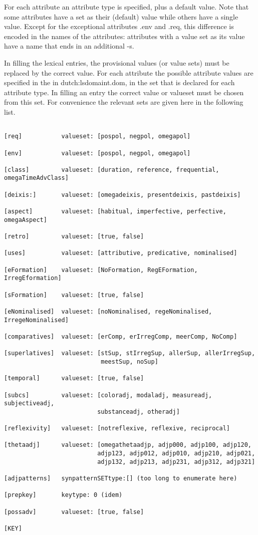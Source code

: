 \newpage
For each attribute an attribute type is specified, plus a default value.
Note that some attributes have a set as their (default) value while
others have a single 
value. 
Except for the  exceptional attributes .env and .req,
this difference is encoded 
in the names of the attributes: attributes with a value set as its value have 
a name that ends in an additional -s.

In filling the lexical entries, the provisional values (or value sets) 
must be replaced by the correct value.
For each attribute the possible attribute values are specified in the
in dutch:lsdomaint.dom, in the set that is declared for each attribute type.
In filling an entry the correct value or valueset must be chosen 
from this set.
For convenience the relevant sets are given here in 
 the following  list. 
\begin{verbatim}

[req]           valueset: [pospol, negpol, omegapol]   

[env]           valueset: [pospol, negpol, omegapol]   

[class]         valueset: [duration, reference, frequential, omegaTimeAdvClass]
 
[deixis:]       valueset: [omegadeixis, presentdeixis, pastdeixis]

[aspect]        valueset: [habitual, imperfective, perfective, omegaAspect]

[retro]         valueset: [true, false]

[uses]          valueset: [attributive, predicative, nominalised] 

[eFormation]    valueset: [NoFormation, RegEFormation, IrregEformation]

[sFormation]    valueset: [true, false]

[eNominalised]  valueset: [noNominalised, regeNominalised, IrregeNominalised]

[comparatives]  valueset: [erComp, erIrregComp, meerComp, NoComp]

[superlatives]  valueset: [stSup, stIrregSup, allerSup, allerIrregSup, 
                           meestSup, noSup]

[temporal]      valueset: [true, false]

[subcs]         valueset: [coloradj, modaladj, measureadj, subjectiveadj,
                          substanceadj, otheradj]

[reflexivity]   valueset: [notreflexive, reflexive, reciprocal]

[thetaadj]      valueset: [omegathetaadjp, adjp000, adjp100, adjp120, 
                          adjp123, adjp012, adjp010, adjp210, adjp021,
                          adjp132, adjp213, adjp231, adjp312, adjp321]
                         
[adjpatterns]   synpatternSETtype:[] (too long to enumerate here)

[prepkey]       keytype: 0 (idem)

[possadv]       valueset: [true, false]
  
[KEY]

\end{verbatim}

